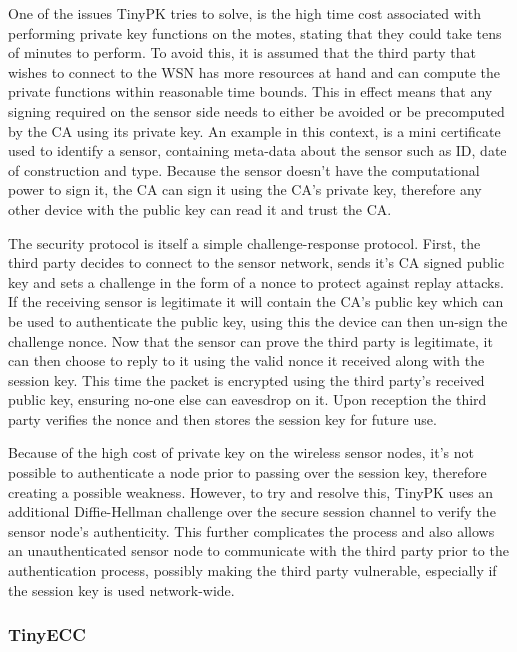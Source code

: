\documentclass{mprop}
\begin{document}
One of the issues TinyPK tries to solve, is the high time cost associated with performing private key functions on the motes, stating that they could take tens of minutes to perform. To avoid this, it is assumed that the third party that wishes to connect to the WSN has more resources at hand and can compute the private functions within reasonable time bounds. This in effect means that any signing required on the sensor side needs to either be avoided or be precomputed by the CA using its private key. An example in this context, is a mini certificate used to identify a sensor, containing meta-data about the sensor such as ID, date of construction and type. Because the sensor doesn't have the computational power to sign it, the CA can sign it using the CA's private key, therefore any other device with the public key can read it and trust the CA.

The security protocol is itself a simple challenge-response protocol. First, the third party decides to connect to the sensor network, sends it's CA signed public key and sets a challenge in the form of a nonce to protect against replay attacks. If the receiving sensor is legitimate it will contain the CA's public key which can be used to authenticate the public key, using this the device can then un-sign the challenge nonce. Now that the sensor can prove the third party is legitimate, it can then choose to reply to it using the valid nonce it received along with the session key. This time the packet is encrypted using the third party's received public key, ensuring no-one else can eavesdrop on it. Upon reception the third party verifies the nonce and then stores the session key for future use. 

Because of the high cost of private key on the wireless sensor nodes, it's not possible to authenticate a node prior to passing over the session key, therefore creating a possible weakness. However, to try and resolve this, TinyPK uses an additional Diffie-Hellman challenge over the secure session channel to verify the sensor node's authenticity. This further complicates the process and also allows an unauthenticated sensor node to communicate with the third party prior to the authentication process, possibly making the third party vulnerable, especially if the session key is used network-wide.

\subsubsection{TinyECC} %
\label{ssub:tinyecc}

\end{document}
